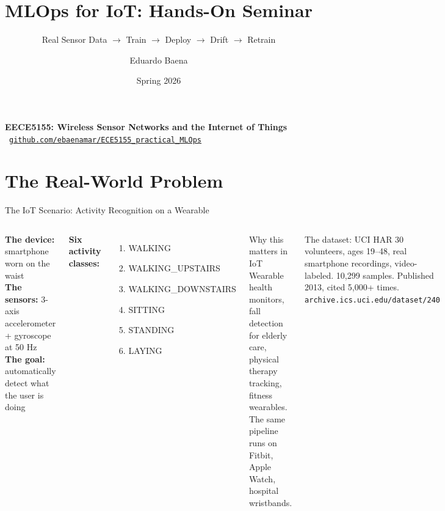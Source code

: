 \documentclass[aspectratio=169,11pt]{beamer}
\title[EECE5155 -- MLOps Seminar]{MLOps for IoT: Hands-On Seminar}
\subtitle{Real Sensor Data $\rightarrow$ Train $\rightarrow$ Deploy $\rightarrow$ Drift $\rightarrow$ Retrain}
\author{Eduardo Baena}
\date{Spring 2026}
\institute{Northeastern University\\
\texttt{e.baena@northeastern.edu}}
\begin{document}
\begin{frame}
    \titlepage
    \vspace{-0.8cm}
    \begin{center}
        \textbf{EECE5155: Wireless Sensor Networks and the Internet of Things}\\[4pt]
        {\small {}\ \texttt{\href{https://github.com/ebaenamar/ECE5155\_practical\_MLOps}{github.com/ebaenamar/ECE5155\_practical\_MLOps}}}
    \end{center}
\end{frame}

\section{The Real-World Problem}

\begin{frame}{The IoT Scenario: Activity Recognition on a Wearable}
    \begin{columns}
        \textbf{The device:} smartphone worn on the waist\\
        \textbf{The sensors:} 3-axis accelerometer + gyroscope at 50 Hz\\
        \textbf{The goal:} automatically detect what the user is doing

        \vspace{0.3cm}
        \textbf{Six activity classes:}
        \begin{enumerate}
            \item WALKING
            \item WALKING\_UPSTAIRS
            \item WALKING\_DOWNSTAIRS
            \item SITTING
            \item STANDING
            \item LAYING
        \end{enumerate}

        \begin{exampleblock}{Why this matters in IoT}
            Wearable health monitors, fall detection for elderly care, physical therapy tracking, fitness wearables. The same pipeline runs on Fitbit, Apple Watch, hospital wristbands.
        \end{exampleblock}

        \vspace{0.2cm}
        \begin{block}{The dataset: UCI HAR}
            30 volunteers, ages 19--48, real smartphone recordings, video-labeled.
            10,299 samples. Published 2013, cited 5,000+ times.\\
            {\footnotesize \texttt{archive.ics.uci.edu/dataset/240}}
        \end{block}
    \end{columns}
\end{frame}
\end{document}
